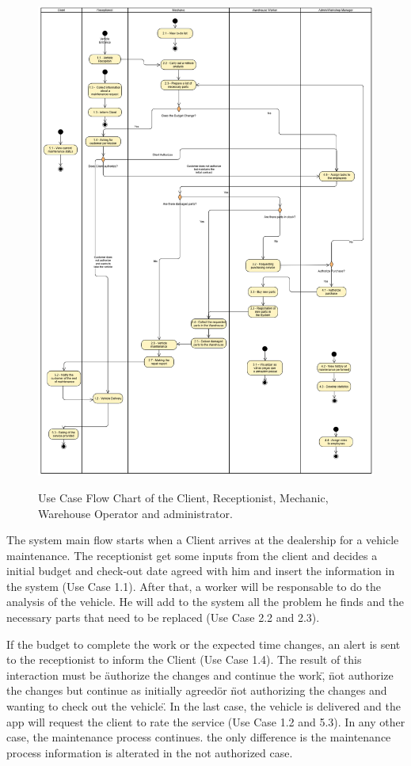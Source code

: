 \begin{figure}[h]
  \caption{Use Case Flow Chart of the Client, Receptionist, Mechanic, Warehouse Operator and administrator.}
  \centering
  \includegraphics[width=\textwidth]{figs/UseCaseDiagram}
  \label{fig:figure2}
\end{figure}

The system main flow starts when a Client arrives at the dealership for a vehicle maintenance. 
The receptionist get some inputs from the client and decides a initial budget and check-out date agreed with him and insert the information in the system (Use Case 1.1).
After that, a worker will be responsable to do the analysis of the vehicle. 
He will add to the system all the problem he finds and the necessary parts that need to be replaced (Use Case 2.2 and 2.3).


If the budget to complete the work or the expected time changes, an alert is sent to the receptionist to inform the Client (Use Case 1.4). 
The result of this interaction must be \"authorize the changes and continue the work\", \"not authorize the changes but continue as initially agreed\" or \"not authorizing the changes and wanting to check out the vehicle\".
In the last case, the vehicle is delivered and the app will request the client to rate the service (Use Case 1.2 and 5.3). 
In any other case, the maintenance process continues. the only difference is the maintenance process information is alterated in the not authorized case.

